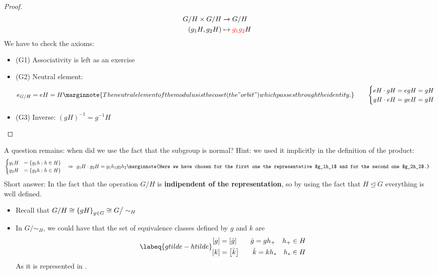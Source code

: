 \documentclass[../main.tex]{subfiles}
\begin{document}
\begin{proof}
\begin{align*}
    G/H \times G/H & \xrightarrow[]{} G/H \\
    (g_1H,g_2H) & \mapsto {\color{red}g_1g_2}H
\end{align*}
We have to check the axioms:
\begin{itemize}
    \item (G1) Associativity is left as an exercise
    \item (G2) Neutral element:
    \[
    e_{G/H}=eH=H\marginnote{The neutral element of the modulus is the coset (the "orbit") which passes through the identity.} \qquad \begin{cases}
    eH\cdot gH=egH=gH\\
    gH\cdot eH=geH=gH
    \end{cases}
    \]
    \item (G3) Inverse: $(gH)^{-1}=g^{-1}H$
\end{itemize}
\end{proof}
A question remains: when did we use the fact that the subgroup is normal? Hint: we used it implicitly in the definition of the product:
\[
\begin{cases}
g_1H & =\{g_1h:h\in H\}\\
g_2H & = \{g_2h:h\in H\}
\end{cases}\quad \Rightarrow \ g_1H \cdot g_2H=g_1h_1g_2h_2\marginnote{Here we have chosen for the first one the representative $g_1h_1$ and for the second one $g_2h_2$.}
\]
Short answer: In the fact that the operation $G/H$ is \textbf{indipendent of the representation}, so by using the fact that $H\trianglelefteq G$ everything is well defined.
\begin{itemize}
    \item Recall that $G/H\cong \Bqty{gH}_{g\in G}\cong G\big/ \sim_H$
    \item In $G\big/ \sim_H$, we could have that the set of equivalence classes defined by $g$ and $k$ are
    \begin{equation}\labeq{gtilde-htilde}
    \begin{split}
        \bqty{g}&=\bqty{\tilde{g}} \qquad \tilde{g}=gh_+ \quad h_+\in H\\ 
        \bqty{k}&=\bqty{\tilde{k}} \qquad \tilde{k}=kh_\ast \quad h_\ast\in H
    \end{split}
    \end{equation}
    As it is represented in .
\end{itemize}
\end{document}
